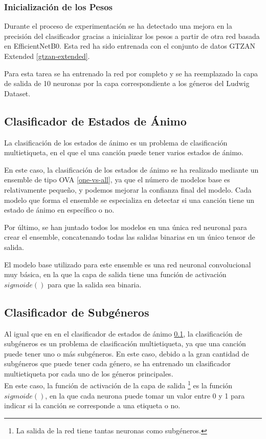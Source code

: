 \subsubsection{Inicialización de los Pesos}
Durante el proceso de experimentación se ha detectado una mejora en la precisión del clasificador gracias a inicializar los pesos a partir de otra red basada en EfficientNetB0. Esta red ha sido entrenada con el conjunto de datos GTZAN Extended \ref{gtzan-extended}.

Para esta tarea se ha entrenado la red por completo y se ha reemplazado la capa de salida de 10 neuronas por la capa correspondiente a los géneros del Ludwig Dataset. 

\subsection{Clasificador de Estados de Ánimo} \label{mood_ensemble}
La clasificación de los estados de ánimo es un problema de clasificación multietiqueta, en el que el una canción puede tener varios estados de ánimo. 

En este caso, la clasificación de los estados de ánimo se ha realizado mediante un ensemble de tipo OVA \ref{one-vs-all}, ya que el número de modelos base es relativamente pequeño, y podemos mejorar la confianza final del modelo. Cada modelo que forma el ensemble se especializa en detectar si una canción tiene un estado de ánimo en específico o no. 

Por último, se han juntado todos los modelos en una única red neuronal para crear el ensemble, concatenando todas las salidas binarias en un único tensor de salida. 

El modelo base utilizado para este ensemble es una red neuronal convolucional muy básica, en la que la capa de salida tiene una función de activación $sigmoide()$ para que la salida sea binaria.  

\subsection{Clasificador de Subgéneros}
Al igual que en en el clasificador de estados de ánimo \ref{mood_ensemble}, la clasificación de subgéneros es un problema de clasificación multietiqueta, ya que una canción puede tener uno o más subgéneros. 
En este caso, debido a la gran cantidad de subgéneros que puede tener cada género, 
se ha entrenado un clasificador multietiqueta por cada uno de los géneros principales.\\
En este caso, la función de activación de la capa de salida \footnote{La salida de la red tiene tantas neuronas como subgéneros.} es la función $sigmoide()$, en la que cada neurona puede tomar un valor entre 0 y 1 para indicar si la canción se corresponde a una etiqueta o no.


